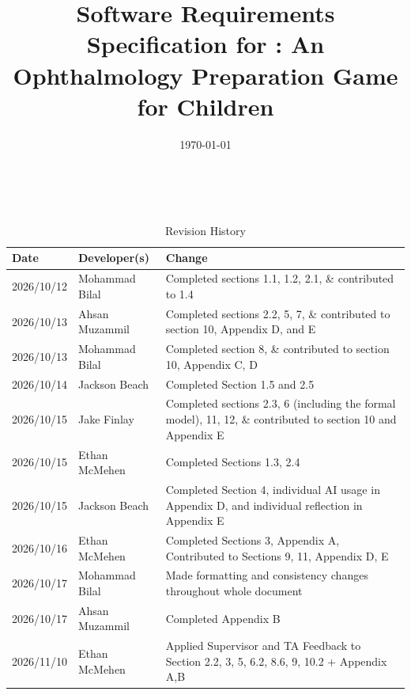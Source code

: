 \documentclass[10pt]{article}
\begin{document}
\title{Software Requirements Specification for \progname: An Ophthalmology Preparation Game for Children} 
\author{\authname}
\date{\today}
	
\maketitle

~\newpage


\tableofcontents

\newpage

\begin{table}[!htbp]
\caption{Revision History} \label{TblRevisionHistory}
\begin{tabularx}{\textwidth}{llX}
\toprule
\textbf{Date} & \textbf{Developer(s)} & \textbf{Change}\\
\midrule
2026/10/12 & Mohammad Bilal & Completed sections 1.1, 1.2, 2.1, \& contributed to 1.4 \\
2026/10/13 & Ahsan Muzammil & Completed sections 2.2, 5, 7, \& contributed to section 10, Appendix D, and E \\
2026/10/13 & Mohammad Bilal & Completed section 8, \& contributed to section 10, Appendix C, D \\
2026/10/14 & Jackson Beach & Completed Section 1.5 and 2.5 \\
2026/10/15 & Jake Finlay & Completed sections 2.3, 6 (including the formal model), 11, 12, \& contributed to section 10 and Appendix E \\
2026/10/15 & Ethan McMehen & Completed Sections 1.3, 2.4 \\
2026/10/15 & Jackson Beach & Completed Section 4, individual AI usage in Appendix D, and individual reflection in Appendix E \\
2026/10/16 & Ethan McMehen & Completed Sections 3, Appendix A, Contributed to Sections 9, 11, Appendix D, E \\
2026/10/17 & Mohammad Bilal & Made formatting and consistency changes throughout whole document \\
2026/10/17 & Ahsan Muzammil & Completed Appendix B \\
2026/11/10 & Ethan McMehen & Applied Supervisor and TA Feedback to Section 2.2, 3, 5, 6.2, 8.6, 9, 10.2 + Appendix A,B \\
\bottomrule
\end{tabularx}
\end{table}

\newpage
\end{document}
